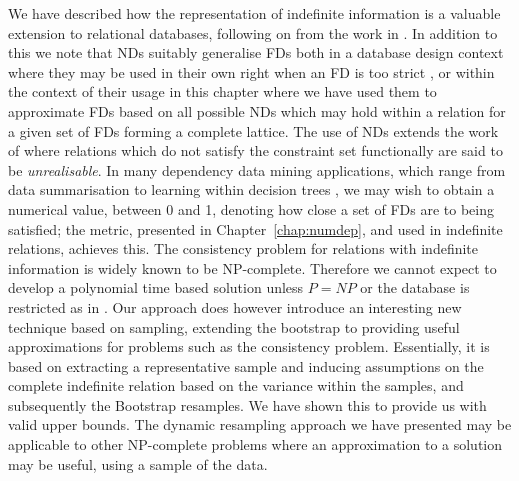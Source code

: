 We have described how the representation of indefinite information is a 
valuable extension to relational databases, following on from the work
in \cite{inv91,vn95}. In addition to this we 
note that NDs suitably generalise FDs
both in a database design context where they may be used in their
own right when an FD is too strict \cite{gm85b}, or within the context of their
usage in this chapter where we have used them to approximate FDs based
on all possible NDs which may hold within a relation for a given set
of FDs forming a complete lattice.  The use of NDs extends the work of
\cite{vn95} 
where relations which do not satisfy the constraint set functionally are
said to be {\em unrealisable}. In many dependency data mining applications,
which range from data summarisation to learning within decision trees \cite{psm93}, we may wish to obtain a numerical value, between 0 and 1, denoting how close a set of 
FDs are to being satisfied; the metric, presented in
Chapter~\ref{chap:numdep}, and used in indefinite relations, achieves
this. 
The consistency problem for relations with indefinite information is
widely known to be NP-complete. Therefore we cannot expect to
develop a polynomial time based solution unless $P = NP$ or the database is
restricted as in \cite{vn95}. Our approach
does however introduce an interesting new technique based on sampling,
extending the bootstrap to providing useful approximations for
problems such as the consistency problem. Essentially, it is based on
extracting a representative sample and inducing assumptions on the 
complete indefinite relation based on the variance within the samples, and
subsequently the Bootstrap resamples. We have shown this to provide us
with valid upper bounds. The dynamic resampling approach we have
presented may be applicable to other NP-complete problems where an
approximation to a solution may be useful, using a sample of the data.

\medskip

